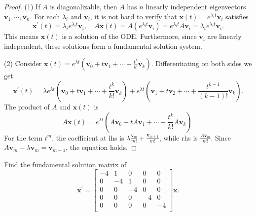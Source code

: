 \begin{proof}
  (1) If $A$ is diagonalizable, then $A$ has $n$ linearly independent eigenvectors
  $\mathbf{v}_1,\cdots,\mathbf{v}_n$. For each $\lambda_i$ and $\mathbf{v}_i$, it is not hard to
  verify that $\mathbf{x}(t) = e^{\lambda_i t}\mathbf{v}_i$ satisfies
  \begin{equation}
    \mathbf{x}^{\prime}(t) = \lambda_i e^{\lambda_i t}\mathbf{v}_i, \quad
    A\mathbf{x}(t) = A (e^{\lambda_i t}\mathbf{v}_i) = e^{\lambda_i t} A\mathbf{v}_i = \lambda_i e^{\lambda_i t}\mathbf{v}_i.
  \end{equation}
  This means $\mathbf{x}(t)$ is a solution of the ODE.
  Furthermore, since $\mathbf{v}_i$ are linearly independent, these solutions form a fundamental solution system.

  (2) Consider $\mathbf{x}(t) = e^{\lambda t} \left( \mathbf{v}_0 + t\mathbf{v}_1 + \cdots + \frac{t^k}{k!}\mathbf{v}_k \right)$.
  Differentiating on both sides we get
  \begin{equation}
    \mathbf{x}^{\prime}(t) = \lambda e^{\lambda t} \left( \mathbf{v}_0 + t\mathbf{v}_1 + \cdots + \frac{t^k}{k!}\mathbf{v}_k \right) + e^{\lambda t} \left( \mathbf{v}_1 + t\mathbf{v}_2 + \cdots + \frac{t^{k-1}}{(k-1)!}\mathbf{v}_k \right).
  \end{equation}
  The product of $A$ and $\mathbf{x}(t)$ is
  \begin{equation}
    A\mathbf{x}(t) = e^{\lambda t} \left( A\mathbf{v}_0 + tA\mathbf{v}_1 + \cdots + \frac{t^k}{k!}A\mathbf{v}_k \right).
  \end{equation}
  For the term $t^m$, the coefficient at lhs is $\lambda \frac{\mathbf{v}_m}{m!} + \frac{\mathbf{v}_{m+1}}{m!}$,
  while rhs is $\frac{A\mathbf{v}_m}{m!}$.
  Since $A\mathbf{v}_{m} - \lambda \mathbf{v}_{m} = \mathbf{v}_{m+1}$, the equation holds.
\end{proof}

\begin{example}{}{}
  Find the fundamental solution matrix of
  \begin{equation}
    \mathbf{x}^{\prime} =
    \begin{bmatrix}
      -4 & 1 & 0 & 0 & 0\\
      0 & -4 & 1 & 0 & 0\\
      0 & 0 & -4 & 0 & 0\\
      0 & 0 & 0 & -4 & 0\\
      0 & 0 & 0 & 0 & -4\\
    \end{bmatrix} \mathbf{x}.
  \end{equation}
\end{example}

